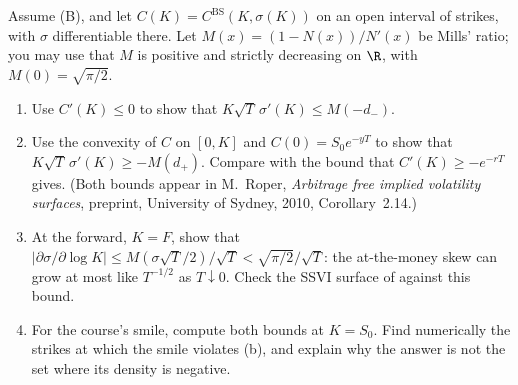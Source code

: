 \begin{exercise}\label{ex:sk-skew-bounds}
\hard Assume (B), and let $C(K)=C^{\mathrm{BS}}(K,\sigma(K))$ on an open interval of strikes, with $\sigma$
differentiable there. Let $M(x)=(1-N(x))/N'(x)$ be Mills' ratio; you may use that $M$ is positive and
strictly decreasing on $\R$, with $M(0)=\sqrt{\pi/2}$.
\begin{enumerate}[label=(\alph*)]
  \item Use $C'(K)\le0$ to show that $K\sqrt T\,\sigma'(K)\le M(-d_-)$.
  \item Use the convexity of $C$ on $[0,K]$ and $C(0)=S_0e^{-yT}$ to show that $K\sqrt T\,\sigma'(K)\ge-M(d_+)$.
    Compare with the bound that $C'(K)\ge-e^{-rT}$ gives. (Both bounds appear in
    M.~Roper, \emph{Arbitrage free implied volatility surfaces}, preprint, University of Sydney, 2010,
    Corollary~2.14.)
  \item At the forward, $K=F$, show that $|\partial\sigma/\partial\log K|\le M(\sigma\sqrt T/2)/\sqrt T<\sqrt{\pi/2}/\sqrt T$:
    the at-the-money skew can grow at most like $T^{-1/2}$ as $T\downarrow0$. Check the SSVI surface of
     against this bound.
  \item For the course's smile, compute both bounds at $K=S_0$. Find numerically the strikes at which the
    smile violates (b), and explain why the answer is not the set where its density is negative.
\end{enumerate}
\end{exercise}
